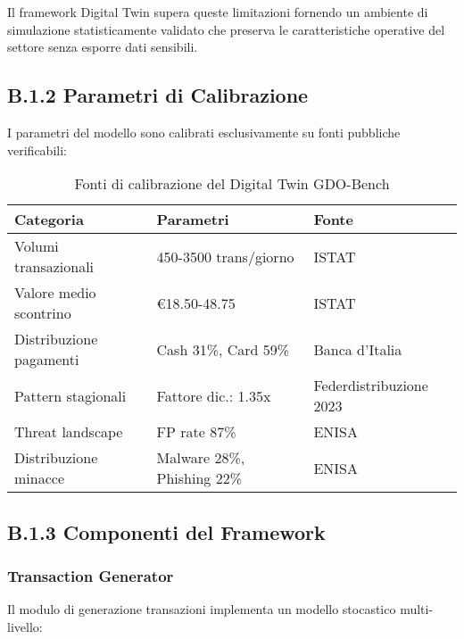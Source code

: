 Il framework Digital Twin supera queste limitazioni fornendo un ambiente di simulazione statisticamente validato che preserva le caratteristiche operative del settore senza esporre dati sensibili.

\subsection{\texorpdfstring{\textbf{B.1.2 Parametri di Calibrazione}}{B.1.2 - Parametri di Calibrazione}}

I parametri del modello sono calibrati esclusivamente su fonti pubbliche verificabili:

\begin{table}[h]
\centering
\caption{Fonti di calibrazione del Digital Twin GDO-Bench}
\label{tab:calibration-sources}
\begin{tabular}{@{}lll@{}}
\toprule
\textbf{Categoria} & \textbf{Parametri} & \textbf{Fonte} \\
\midrule
Volumi transazionali & 450-3500 trans/giorno & ISTAT\autocite{istat2023} \\
Valore medio scontrino & €18.50-48.75 & ISTAT\autocite{istat2023} \\
Distribuzione pagamenti & Cash 31\%, Card 59\% & Banca d'Italia\autocite{bancaditalia2023} \\
Pattern stagionali & Fattore dic.: 1.35x & Federdistribuzione 2023 \\
Threat landscape & FP rate 87\% & ENISA\autocite{enisa2023} \\
Distribuzione minacce & Malware 28\%, Phishing 22\% & ENISA\autocite{enisa2023} \\
\bottomrule
\end{tabular}
\end{table}

\subsection{\texorpdfstring{\textbf{B.1.3 Componenti del Framework}}{B.1.3 - Componenti del Framework}}

\subsubsection{\texorpdfstring{\textbf{Transaction Generator}}{Transaction Generator}}

Il modulo di generazione transazioni implementa un modello stocastico multi-livello:

